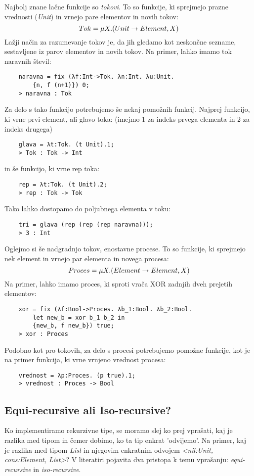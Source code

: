 \documentclass[a4paper]{report}
\begin{document}
Najbolj znane lačne funkcije so \emph{tokovi}. To so funkcije, ki sprejmejo prazne vrednosti (\emph{Unit}) in vrnejo pare elementov in novih tokov:
\begin{equation}
    Tok = \mu X. (Unit \rightarrow {Element, X}) \notag
\end{equation}
Lažji način za razumevanje tokov je, da jih gledamo kot neskončne sezname, sestavljene iz parov elementov in novih tokov. Na primer, lahko imamo tok naravnih števil:
\begin{lstlisting}
    naravna = fix (λf:Int->Tok. λn:Int. λu:Unit. 
        {n, f (n+1)}) 0;
    > naravna : Tok
\end{lstlisting}
Za delo s tako funkcijo potrebujemo še nekaj pomožnih funkcij. Najprej funkcijo, ki vrne prvi element, ali glavo toka: (imejmo 1 za indeks prvega elementa in 2 za indeks drugega)
\begin{lstlisting}
    glava = λt:Tok. (t Unit).1;
    > Tok : Tok -> Int
\end{lstlisting}
in še funkcijo, ki vrne rep toka:
\begin{lstlisting}
    rep = λt:Tok. (t Unit).2;
    > rep : Tok -> Tok
\end{lstlisting}
Tako lahko dostopamo do poljubnega elementa v toku:
\begin{lstlisting}
    tri = glava (rep (rep (rep naravna)));
    > 3 : Int
\end{lstlisting}

Oglejmo si še nadgradnjo tokov, enostavne procese. To so funkcije, ki sprejmejo nek element in vrnejo par elementa in novega procesa:
\begin{equation}
    Proces = \mu X. (Element \rightarrow {Element, X}) \notag
\end{equation}
Na primer, lahko imamo proces, ki sproti vrača XOR zadnjih dveh prejetih elementov:
\begin{lstlisting}
    xor = fix (λf:Bool->Proces. λb_1:Bool. λb_2:Bool. 
        let new_b = xor b_1 b_2 in
        {new_b, f new_b}) true;
    > xor : Proces
\end{lstlisting}
Podobno kot pro tokovih, za delo s procesi potrebujemo pomožne funkcije, kot je na primer funkcija, ki vrne vrnjeno vrednost procesa:
\begin{lstlisting}
    vrednost = λp:Proces. (p true).1;
    > vrednost : Proces -> Bool
\end{lstlisting}


\subsection{Equi-recursive ali Iso-recursive?}
Ko implementiramo rekurzivne tipe, se moramo slej ko prej vprašati, kaj je razlika med tipom in čemer dobimo, ko ta tip enkrat 'odvijemo'. Na primer, kaj je razlika med tipom \emph{List}
in njegovim enkratnim odvojem \emph{<nil:Unit, cons:{Element, List}>}? V literatiri pojavita dva pristopa k temu vprašanju: \emph{equi-recursive} in \emph{iso-recursive}.
\end{document}
